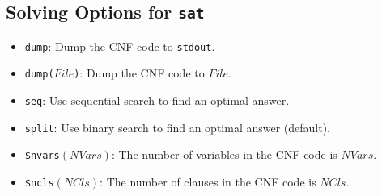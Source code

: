 \subsection{Solving Options for \texttt{sat}}
\begin{itemize}
\item \texttt{dump}: Dump the CNF code to \texttt{stdout}.
\item \texttt{dump($File$)}: Dump the CNF code to $File$.
\item \texttt{seq}: Use sequential search to find an optimal answer.
\item \texttt{split}: Use binary search to find an optimal answer (default).
\item \texttt{\$nvars$(NVars)$}: The number of variables in the CNF code is $NVars$.
\item \texttt{\$ncls$(NCls)$}: The number of clauses in the CNF code is $NCls$.
\end{itemize}

